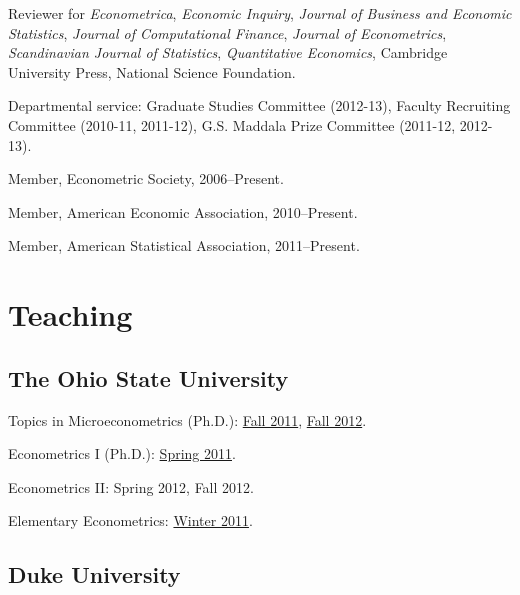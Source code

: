 \documentclass[10pt,letterpaper]{article}
\renewenvironment{itemize}{
  \begin{list}{}{
    \setlength{\leftmargin}{1.5em}
    \setlength{\itemsep}{0.25em}
    \setlength{\parskip}{0pt}
    \setlength{\parsep}{0.25em}
  }
}{
  \end{list}
}
\begin{document}
\begin{itemize}
\item Reviewer for
  \textit{Econometrica}, %
  \textit{Economic Inquiry}, %
  \textit{Journal of Business and Economic Statistics}, %
  \textit{Journal of Computational Finance}, %
  \textit{Journal of Econometrics}, %
  \textit{Scandinavian Journal of Statistics}, %
  \textit{Quantitative Economics}, %
  Cambridge University Press, %
  National Science Foundation. %
\item Departmental service:
  Graduate Studies Committee (2012-13),
  Faculty Recruiting Committee (2010-11, 2011-12),
  G.S. Maddala Prize Committee (2011-12, 2012-13).
\item Member, Econometric Society, 2006--Present.
\item Member, American Economic Association, 2010--Present.
\item Member, American Statistical Association, 2011--Present.
\end{itemize}

\section*{Teaching}

\subsection*{The Ohio State University}

\begin{itemize}
\item Topics in Microeconometrics (Ph.D.):
  \href{http://jblevins.org/courses/econ843f11/}{Fall 2011}, %
  \href{http://jblevins.org/courses/econ8833f12/}{Fall 2012}. %
\item Econometrics I (Ph.D.):
  \href{http://jblevins.org/courses/econ741s11/}{Spring 2011}. %
\item Econometrics II:
  Spring 2012, %
  Fall 2012. %
\item Elementary Econometrics:
  \href{http://jblevins.org/courses/econ444w11/}{Winter 2011}. %
\end{itemize}

\subsection*{Duke University}
\end{document}
